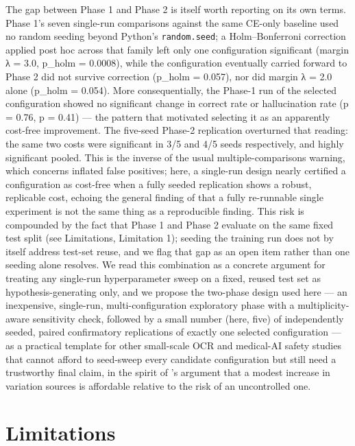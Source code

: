 \documentclass[fleqn,10pt]{wlpeerj}
\begin{document}
The gap between Phase 1 and Phase 2 is itself worth reporting on its own terms. Phase 1's seven single-run comparisons against the same CE-only baseline used no random seeding beyond Python's \texttt{random.seed}; a Holm--Bonferroni correction applied post hoc across that family left only one configuration significant (margin λ = 3.0, p\_holm = 0.0008), while the configuration eventually carried forward to Phase 2 did not survive correction (p\_holm = 0.057), nor did margin λ = 2.0 alone (p\_holm = 0.054). More consequentially, the Phase-1 run of the selected configuration showed no significant change in correct rate or hallucination rate (p = 0.76, p = 0.41) --- the pattern that motivated selecting it as an apparently cost-free improvement. The five-seed Phase-2 replication overturned that reading: the same two costs were significant in 3/5 and 4/5 seeds respectively, and highly significant pooled. This is the inverse of the usual multiple-comparisons warning, which concerns inflated false positives; here, a single-run design nearly certified a configuration as cost-free when a fully seeded replication shows a robust, replicable cost, echoing the general finding of \citet{bouthillier2019unreproducible} that a fully re-runnable single experiment is not the same thing as a reproducible finding. This risk is compounded by the fact that Phase 1 and Phase 2 evaluate on the same fixed test split (see Limitations, Limitation 1); seeding the training run does not by itself address test-set reuse, and we flag that gap as an open item rather than one seeding alone resolves. We read this combination as a concrete argument for treating any single-run hyperparameter sweep on a fixed, reused test set as hypothesis-generating only, and we propose the two-phase design used here --- an inexpensive, single-run, multi-configuration exploratory phase with a multiplicity-aware sensitivity check, followed by a small number (here, five) of independently seeded, paired confirmatory replications of exactly one selected configuration --- as a practical template for other small-scale OCR and medical-AI safety studies that cannot afford to seed-sweep every candidate configuration but still need a trustworthy final claim, in the spirit of \citet{bouthillier2021accounting}'s argument that a modest increase in variation sources is affordable relative to the risk of an uncontrolled one.

\section*{Limitations}\label{sec:limitations}
\end{document}
